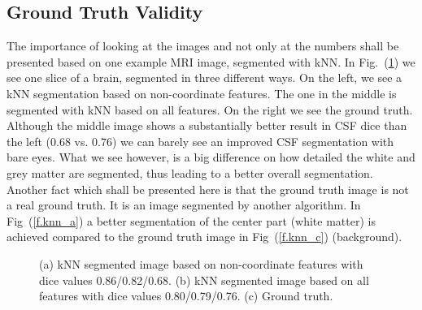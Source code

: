 \documentclass[journal]{IEEEtran}
\begin{document}
\subsection{Ground Truth Validity}

The importance of looking at the images and not only at the numbers shall be presented based on one example MRI image, segmented with kNN. In Fig.~(\ref{f.ground_truth}) we see one slice of a brain, segmented in three different ways. On the left, we see a kNN segmentation based on non-coordinate features. The one in the middle is segmented with kNN based on all features. On the right we see the ground truth. Although the middle image shows a substantially better result in CSF dice than the left (0.68 vs. 0.76) we can barely see an improved CSF segmentation with bare eyes. What we see however, is a big difference on how detailed the white and grey matter are segmented, thus leading to a better overall segmentation. Another fact which shall be presented here is that the ground truth image is not a real ground truth. It is an image segmented by another algorithm. In Fig~(\ref{f.knn_a}) a better segmentation of the center part (white matter) is achieved compared to the ground truth image in Fig~(\ref{f.knn_c}) (background).

\begin{figure}
	\centering
	\hfill
	\hfill
	\caption{(a) kNN segmented image based on non-coordinate features with dice values 0.86/0.82/0.68. (b) kNN segmented image based on all features with dice values 0.80/0.79/0.76. (c) Ground truth.}
	\label{f.ground_truth}
\end{figure}
\end{document}
